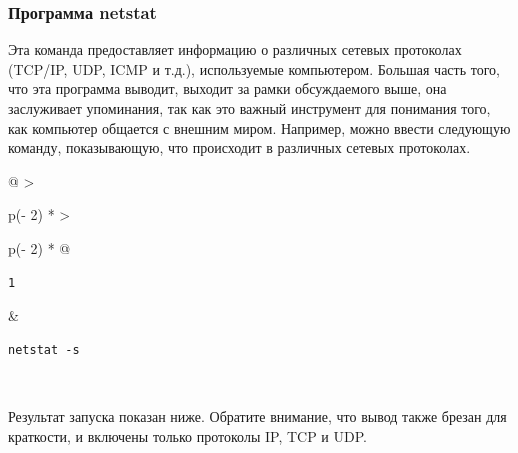 \documentclass{article}
\begin{document}
\hypertarget{netstat}{%
\subsubsection{\texorpdfstring{\protect\hyperlink{netstat}{}Программа
netstat}{Программа netstat}}\label{netstat}}

Эта команда предоставляет информацию о различных сетевых протоколах
(TCP/IP, UDP, ICMP и т.д.), используемые компьютером. Большая часть
того, что эта программа выводит, выходит за рамки обсуждаемого выше, она
заслуживает упоминания, так как это важный инструмент для понимания
того, как компьютер общается с внешним миром. Например, можно ввести
следующую команду, показывающую, что происходит в различных сетевых
протоколах.

\begin{longtable}[]{@{}
  >{\raggedright\arraybackslash}p{(\columnwidth - 2\tabcolsep) * }
  >{\raggedright\arraybackslash}p{(\columnwidth - 2\tabcolsep) * }@{}}
\toprule
\endhead
\begin{minipage}[t]{\linewidth}\raggedright
\begin{verbatim}
1
\end{verbatim}
\end{minipage} & \begin{minipage}[t]{\linewidth}\raggedright
\begin{verbatim}
netstat -s
\end{verbatim}
\end{minipage} \\ \addlinespace
\bottomrule
\end{longtable}

Результат запуска показан ниже. Обратите внимание, что вывод также
брезан для краткости, и включены только протоколы IP, TCP и UDP.
\end{document}
